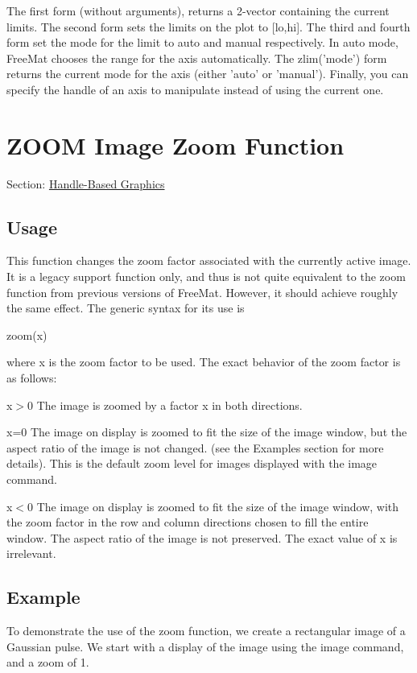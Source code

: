  The first form (without arguments), returns a 2-\/vector containing the current limits. The second form sets the limits on the plot to {\ttfamily \mbox{[}lo,hi\mbox{]}}. The third and fourth form set the mode for the limit to {\ttfamily auto} and {\ttfamily manual} respectively. In {\ttfamily auto} mode, Free\-Mat chooses the range for the axis automatically. The {\ttfamily zlim('mode')} form returns the current mode for the axis (either {\ttfamily 'auto'} or {\ttfamily 'manual'}). Finally, you can specify the handle of an axis to manipulate instead of using the current one. \hypertarget{handle_zoom}{}\section{Z\-O\-O\-M Image Zoom Function}\label{handle_zoom}
Section\-: \hyperlink{sec_handle}{Handle-\/\-Based Graphics} \hypertarget{vtkwidgets_vtkxyplotwidget_Usage}{}\subsection{Usage}\label{vtkwidgets_vtkxyplotwidget_Usage}
This function changes the zoom factor associated with the currently active image. It is a legacy support function only, and thus is not quite equivalent to the {\ttfamily zoom} function from previous versions of Free\-Mat. However, it should achieve roughly the same effect. The generic syntax for its use is \begin{DoxyVerb}  zoom(x)
\end{DoxyVerb}
 where {\ttfamily x} is the zoom factor to be used. The exact behavior of the zoom factor is as follows\-: 
\begin{DoxyItemize}
\item {\ttfamily x$>$0} The image is zoomed by a factor {\ttfamily x} in both directions.  
\item {\ttfamily x=0} The image on display is zoomed to fit the size of the image window, but the aspect ratio of the image is not changed. (see the Examples section for more details). This is the default zoom level for images displayed with the {\ttfamily image} command.  
\item {\ttfamily x$<$0} The image on display is zoomed to fit the size of the image window, with the zoom factor in the row and column directions chosen to fill the entire window. The aspect ratio of the image is not preserved. The exact value of {\ttfamily x} is irrelevant.  
\end{DoxyItemize}\hypertarget{variables_struct_Example}{}\subsection{Example}\label{variables_struct_Example}
To demonstrate the use of the {\ttfamily zoom} function, we create a rectangular image of a Gaussian pulse. We start with a display of the image using the {\ttfamily image} command, and a zoom of 1.


